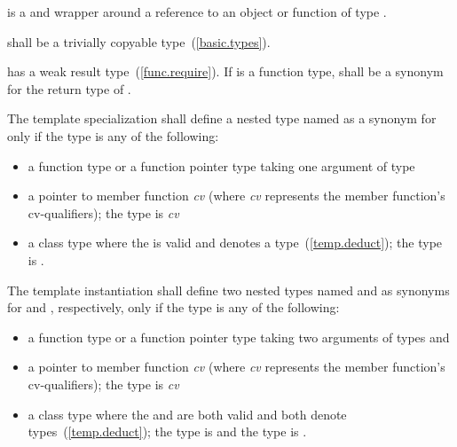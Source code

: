 \pnum
{} is a  and  wrapper
around a reference to an object or function of type .

\pnum
{} shall be a trivially copyable type~(\ref{basic.types}).

\pnum
{} has a weak result type~(\ref{func.require}).
If  is a function type,  shall be a synonym for the
return type of .

\pnum
The template specialization  shall
define a nested type named  as a synonym for 
only if the type  is any of the
following:

\begin{itemize}
\item
a function type or a function pointer type taking one argument of type 

\item
a pointer to member function  \textit{cv} (where \textit{cv} represents the
member function's cv-qualifiers); the type  is \textit{cv} 

\item
a class type where the   is valid and
denotes a type~(\ref{temp.deduct}); the type  is
.
\end{itemize}

\pnum
The template instantiation  shall
define two nested types named  and 
as synonyms for  and , respectively,
only if the type
 is any of the following:

\begin{itemize}
\item
a function type or a function pointer type taking two arguments of types  and

\item
a pointer to member function  \textit{cv} (where \textit{cv} represents the
member function's cv-qualifiers); the type  is \textit{cv} 

\item
a class type where the   and
 are both valid and
both denote types~(\ref{temp.deduct});
the type  is 
and the type  is .

\end{itemize}

